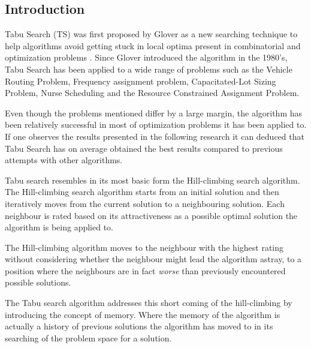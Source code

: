 \subsection{Introduction}
\label{sec:TSIntroduction}
Tabu Search (TS) was first proposed by Glover as a new searching technique to help algorithms avoid getting  stuck in local optima present in combinatorial and optimization problems \cite{TabuRCAProblem}. Since Glover introduced the algorithm in the 1980's, Tabu Search has been applied to a wide range of problems such as the Vehicle Routing Problem\cite{TabuVechicleRoutingWithTimeWindows}, Frequency assignment problem\cite{TabuMontemanniSmith}, Capacitated-Lot Sizing Problem\cite{TabuCarryOver}, Nurse Scheduling\cite{TabuNurse} and the Resource Constrained Assignment Problem\cite{TabuRCAProblem}. 

Even though the problems mentioned differ by a large margin, the algorithm has been relatively successful in most of optimization problems it has been applied to. If one observes the results presented in the following research \cite{TabuCarryOver,TabuSingleMachineScheduling,TabuVechicleRoutingWithTimeWindows,TabuBiddingStrats,TabuCrewSchedulingProblem,ReactiveTabuVHR,TabuRCAProblem,TabuCSP,TabuMontemanniSmith,tabuglobalplanning3g} it can deduced that Tabu Search has on average obtained the best results compared to previous attempts with other algorithms. 

Tabu search resembles in its most basic form the Hill-climbing search algorithm\cite{TabuBiddingStrats}. The Hill-climbing search algorithm starts from an initial solution and then iteratively moves from the current solution to a neighbouring solution\cite{AIModernApproach}. Each neighbour is rated based on its attractiveness as a possible optimal solution the algorithm is being applied to\cite{AIModernApproach}. 

The Hill-climbing algorithm moves to the neighbour with the highest rating without considering whether the neighbour might lead the algorithm astray, to a position where the neighbours are in fact \emph{worse} than previously encountered possible solutions\cite{AIModernApproach}. 

The Tabu search algorithm addresses this short coming of the hill-climbing by introducing the concept of memory\cite{TabuBiddingStrats}. Where the memory of the algorithm is actually a history of previous solutions the algorithm has moved to in its searching of the problem space for a solution\cite{TabuBiddingStrats}. 

